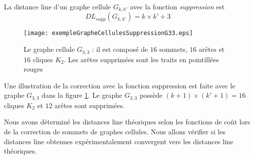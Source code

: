 \begin{theorem}
La distance line  d'un graphe cellule $G_{k,k'}$ avec la fonction {\em suppression} est 
\begin{equation}
DL_{supp}(G_{k,k'}) = k \times k' +3 
\end{equation}
\end{theorem}

\begin{figure}[htb!] 
\centering
\texttt{[image: exempleGrapheCellulesSuppressionG33.eps]}
\caption{ Le graphe cellule $G_{3,3}$ : il est compos\'e de $16$ sommets, $16$ ar\^etes et $16$ cliques $K_2$. Les ar\^etes supprim\'ees sont les traits en pointill\'ees rouges }
\label{exempleCorrectionGrapheCelluleAvecSuppression}
\end{figure}
Une illustration de la correction avec la fonction suppression est faite avec le graphe $G_{3,3}$ dans la figure \ref{exempleCorrectionGrapheCelluleAvecSuppression}.
Le graphe $G_{3,3}$ poss\`ede $(k+1)\times (k'+1) = 16$ cliques $K_2$ et $12$ ar\^etes sont supprim\'ees.
\newline

Nous avons d\'etermin\'e les distances line th\'eoriques selon les fonctions de co\^ut lors de la correction de sommets de graphes cellules. Nous allons v\'erifier si les distances line obtenues exp\'erimentalement convergent vers les distances line th\'eoriques.





